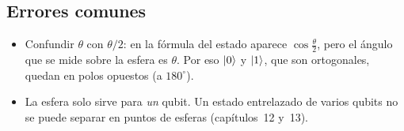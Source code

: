 \subsection{Errores comunes}
\begin{itemize}
  \item Confundir $\theta$ con $\theta/2$: en la fórmula del estado aparece
    $\cos\frac\theta2$, pero el ángulo que se mide sobre la esfera es
    $\theta$. Por eso $\left|0\right\rangle$ y $\left|1\right\rangle$, que son ortogonales, quedan en polos
    opuestos (a $180^\circ$).
  \item La esfera solo sirve para \emph{un} qubit. Un estado entrelazado de
    varios qubits no se puede separar en puntos de esferas (capítulos~12
    y~13).
\end{itemize}


